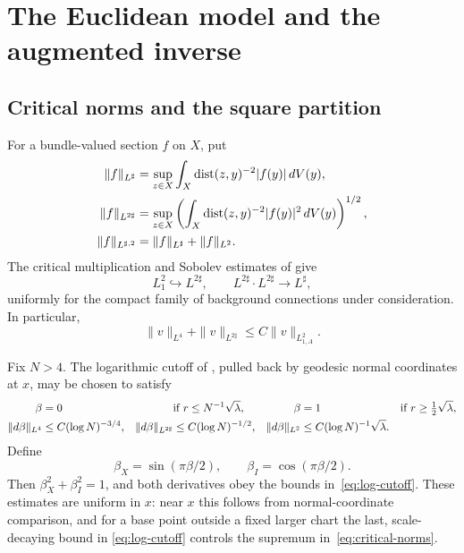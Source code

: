 \documentclass[11pt]{amsart}
\theoremstyle{definition}
\theoremstyle{remark}
\theoremstyle{plain}
\begin{document}
\section{The Euclidean model and the augmented inverse}\label{sec:parametrix}

\subsection{Critical norms and the square partition}
For a bundle-valued section $f$ on $X$, put
\begin{align}\label{eq:critical-norms}
 \|f\|_{L^\sharp}
 &=\sup_{z\in X}\int_X\operatorname{dist}(z,y)^{-2}|f(y)|\,dV(y),\notag\\
 \|f\|_{L^{2\sharp}}
 &=\sup_{z\in X}
 \left(\int_X\operatorname{dist}(z,y)^{-2}|f(y)|^2\,dV(y)\right)^{1/2},\\
 \|f\|_{L^{\sharp,2}}&=\|f\|_{L^\sharp}+\|f\|_{L^2}.
 \notag
\end{align}
The critical multiplication and Sobolev estimates of
\cite[Lemmas~4.1 and~4.3]{FeehanCritical} give
\begin{equation}\label{eq:critical-products}
 L^2_1\hookrightarrow L^{2\sharp},\qquad
 L^{2\sharp}\cdot L^{2\sharp}\longrightarrow L^\sharp,
\end{equation}
uniformly for the compact family of background connections under
consideration.  In particular,
\begin{equation}\label{eq:critical-sobolev}
 \|v\|_{L^4}+\|v\|_{L^{2\sharp}}
 \leq C\|v\|_{L^2_{1,A}}.
\end{equation}

Fix $N>4$.  The logarithmic cutoff of
\cite[Lemma~5.4]{FeehanLenessIII}, pulled back by geodesic normal coordinates
at $x$, may be chosen to satisfy
\begin{align}\label{eq:log-cutoff}
 \beta&=0 &&\text{if }r\leq N^{-1}\sqrt\lambda,
 &\beta&=1 &&\text{if }r\geq\tfrac12\sqrt\lambda,\notag\\
 \|d\beta\|_{L^4}&\leq C(\log N)^{-3/4},
 &\|d\beta\|_{L^{2\sharp}}&\leq C(\log N)^{-1/2},
 &\|d\beta\|_{L^2}&\leq C(\log N)^{-1}\sqrt\lambda.
\end{align}
Define
\begin{equation}\label{eq:square-partition}
 \beta_X=\sin(\pi\beta/2),\qquad
 \beta_I=\cos(\pi\beta/2).
\end{equation}
Then $\beta_X^2+\beta_I^2=1$, and both derivatives obey the
bounds in~\eqref{eq:log-cutoff}.  These estimates are uniform in $x$: near
$x$ this follows from normal-coordinate comparison, and for a base point
outside a fixed larger chart the last, scale-decaying bound in
\eqref{eq:log-cutoff} controls the supremum in~\eqref{eq:critical-norms}.
\end{document}
